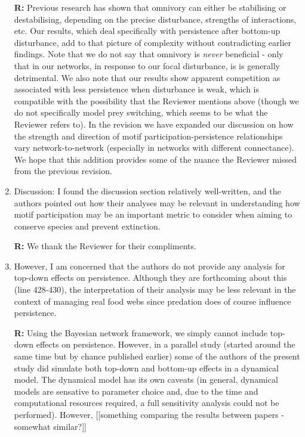 \documentclass[12pt]{article}
\begin{document}
\begin{enumerate}
                \textbf{R:} Previous research has shown that omnivory can either be stabilising or destabilising, depending on the precise disturbance, strengths of interactions, etc. Our results, which deal specifically with persistence after bottom-up disturbance, add to that picture of complexity without contradicting earlier findings. Note that we do not say that omnivory is \emph{never} beneficial - only that in our networks, in response to our focal disturbance, is is generally detrimental. We also note that our results show apparent competition as associated with less persistence when disturbance is weak, which is compatible with the possibility that the Reviewer mentions above (though we do not specifically model prey switching, which seems to be what the Reviewer refers to).  In the revision we have expanded our discussion on how the strength and direction of motif participation-persistence relationships vary network-to-network (especially in networks with different connectance). We hope that this addition provides some of the nuance the Reviewer missed from the previous revision.


            \item Discussion: I found the discussion section relatively well-written, and the authors pointed out how their analyses may be relevant in understanding how motif participation may be an important metric to consider when aiming to conserve species and prevent extinction.

                \textbf{R:} We thank the Reviewer for their compliments.


            \item However, I am concerned that the authors do not provide any analysis for top-down effects on persistence. Although they are forthcoming about this (line 428-430), the interpretation of their analysis may be less relevant in the context of managing real food webs since predation does of course influence persistence.

                \textbf{R:} Using the Bayesian network framework, we simply cannot include top-down effects on persistence. However, in a parallel study (started around the same time but by chance published earlier) some of the authors of the present study did simulate both top-down and bottom-up effects in a dynamical model. The dynamical model has its own caveats (in general, dynamical models are sensative to parameter choice and, due to the time and computational resources required, a full sensitivity analysis could not be performed). However, [[something comparing the results between papers - somewhat similar?]]



\end{enumerate}
\end{document}
